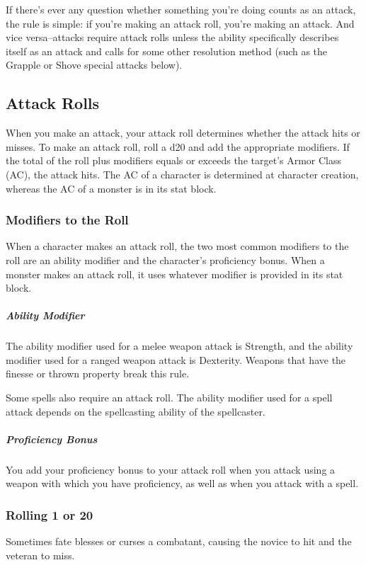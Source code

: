 If there's ever any question whether something you're doing counts as an attack, the rule is simple: if you're making an attack roll, you're making an attack. And vice versa--attacks require attack rolls unless the ability specifically describes itself as an attack and calls for some other resolution method (such as the Grapple or Shove special attacks below).

\subsection{Attack Rolls}

When you make an attack, your attack roll determines whether the attack hits or misses. To make an attack roll, roll a d20 and add the appropriate modifiers. If the total of the roll plus modifiers equals or exceeds the target's Armor Class (AC), the attack hits. The AC of a character is determined at character creation, whereas the AC of a monster is in its stat block.

\subsubsection{Modifiers to the Roll}

When a character makes an attack roll, the two most common modifiers to the roll are an ability modifier and the character's proficiency bonus. When a monster makes an attack roll, it uses whatever modifier is provided in its stat block.

\subparagraph*{Ability Modifier} The ability modifier used for a melee weapon attack is Strength, and the ability modifier used for a ranged weapon attack is Dexterity. Weapons that have the finesse or thrown property break this rule.

Some spells also require an attack roll. The ability modifier used for a spell attack depends on the spellcasting ability of the spellcaster.

\subparagraph*{Proficiency Bonus} You add your proficiency bonus to your attack roll when you attack using a weapon with which you have proficiency, as well as when you attack with a spell.

\subsubsection{Rolling 1 or 20}

Sometimes fate blesses or curses a combatant, causing the novice to hit and the veteran to miss.

